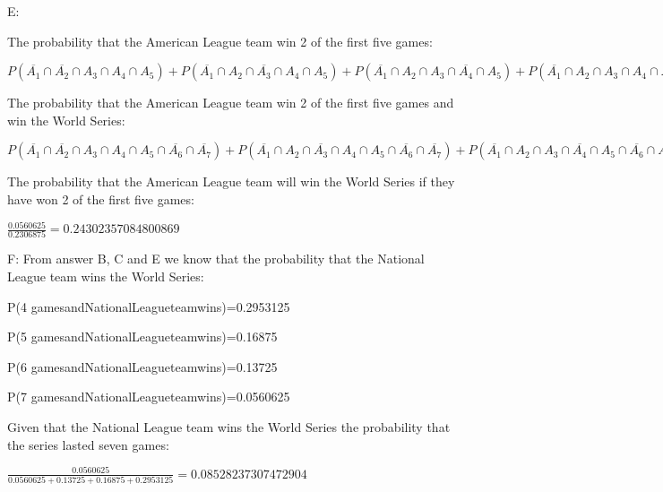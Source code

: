 \documentclass{article}
\begin{document}
E:

	The probability that the American League team win 2 of the first five games:
	
	$P(\overline{A_1}\cap \overline{A_2}\cap A_3\cap A_4\cap A_5)+P(\overline{A_1}\cap A_2\cap \overline{A_3}\cap A_4\cap A_5)+P(\overline{A_1}\cap A_2\cap A_3\cap \overline{A_4}\cap A_5)+P(\overline{A_1}\cap A_2\cap A_3\cap A_4\cap \overline{A_5})+P(A_1\cap \overline{A_2}\cap \overline{A_3}\cap A_4\cap A_5)+P(A_1\cap \overline{A_2}\cap A_3\cap \overline{A_4}\cap A_5)+P(A_1\cap \overline{A_2}\cap A_3\cap A_4\cap \overline{A_5})+P(A_1\cap A_2\cap \overline{A_3}\cap \overline{A_4}\cap A_5)+P(A_1\cap A_2\cap \overline{A_3}\cap A_4\cap \overline{A_5})+P(A_1\cap A_2\cap A_3\cap \overline{A_4}\cap \overline{A_5})=0.2306875$

	The probability that the American League team win 2 of the first five games and win the World Series:
	
	$P(\overline{A_1}\cap \overline{A_2}\cap A_3\cap A_4\cap A_5\cap \overline{A_6}\cap \overline{A_7})+P(\overline{A_1}\cap A_2\cap \overline{A_3}\cap A_4\cap A_5\cap \overline{A_6}\cap \overline{A_7})+P(\overline{A_1}\cap A_2\cap A_3\cap \overline{A_4}\cap A_5\cap \overline{A_6}\cap \overline{A_7})+P(\overline{A_1}\cap A_2\cap A_3\cap A_4\cap \overline{A_5}\cap \overline{A_6}\cap \overline{A_7})+P(A_1\cap \overline{A_2}\cap \overline{A_3}\cap A_4\cap A_5\cap \overline{A_6}\cap \overline{A_7})+P(A_1\cap \overline{A_2}\cap A_3\cap \overline{A_4}\cap A_5\cap \overline{A_6}\cap \overline{A_7})+P(A_1\cap \overline{A_2}\cap A_3\cap A_4\cap \overline{A_5}\cap \overline{A_6}\cap \overline{A_7})+P(A_1\cap A_2\cap \overline{A_3}\cap \overline{A_4}\cap A_5\cap \overline{A_6}\cap \overline{A_7})+P(A_1\cap A_2\cap \overline{A_3}\cap A_4\cap \overline{A_5}\cap \overline{A_6}\cap \overline{A_7})+P(A_1\cap A_2\cap A_3\cap \overline{A_4}\cap \overline{A_5}\cap \overline{A_6}\cap \overline{A_7})=0.0560625$
	
	The probability that the American League team will win the World
Series if they have won 2 of the first five games:

	$\frac{0.0560625}{0.2306875}=0.24302357084800869$

\hspace*{\fill}

F:
From answer B, C and E we know that the probability that the National League team wins the World Series:

	P(4 games\enspace and\enspace National\enspace League\enspace team\enspace wins)=0.2953125
	
	P(5 games\enspace and\enspace National\enspace League\enspace team\enspace wins)=0.16875
	
	P(6 games\enspace and\enspace National\enspace League\enspace team\enspace wins)=0.13725
	
	P(7 games\enspace and\enspace National\enspace League\enspace team\enspace wins)=0.0560625
	
	Given that the National League team wins the World Series the
probability that the series lasted seven games:

	$\frac{0.0560625}{0.0560625+0.13725+0.16875+0.2953125}=0.08528237307472904$
\end{document}
